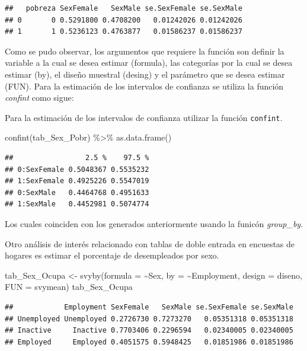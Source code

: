 \documentclass[
  12pt,
]{book}
\newenvironment{Shaded}{\begin{snugshade}}{\end{snugshade}}
\newcommand{\AttributeTok}[1]{\textcolor[rgb]{0.77,0.63,0.00}{#1}}
\newcommand{\FunctionTok}[1]{\textcolor[rgb]{0.00,0.00,0.00}{#1}}
\newcommand{\NormalTok}[1]{#1}
\newcommand{\OtherTok}[1]{\textcolor[rgb]{0.56,0.35,0.01}{#1}}
\newcommand{\SpecialCharTok}[1]{\textcolor[rgb]{0.00,0.00,0.00}{#1}}
\begin{document}
\begin{verbatim}
##   pobreza SexFemale   SexMale se.SexFemale se.SexMale
## 0       0 0.5291800 0.4708200   0.01242026 0.01242026
## 1       1 0.5236123 0.4763877   0.01586237 0.01586237
\end{verbatim}

Como se pudo observar, los argumentos que requiere la función son definir la variable a la cual se desea estimar (formula), las categorías por la cual se desea estimar (by), el diseño muestral (desing) y el parámetro que se desea estimar (FUN). Para la estimación de los intervalos de confianza se utiliza la función \emph{confint} como sigue:

Para la estimación de los intervalos de confianza utilizar la función \texttt{confint}.

\begin{Shaded}
\begin{Highlighting}[]
\FunctionTok{confint}\NormalTok{(tab\_Sex\_Pobr) }\SpecialCharTok{\%\textgreater{}\%} \FunctionTok{as.data.frame}\NormalTok{()}
\end{Highlighting}
\end{Shaded}

\begin{verbatim}
##                 2.5 %    97.5 %
## 0:SexFemale 0.5048367 0.5535232
## 1:SexFemale 0.4925226 0.5547019
## 0:SexMale   0.4464768 0.4951633
## 1:SexMale   0.4452981 0.5074774
\end{verbatim}

Los cuales coinciden con los generados anteriormente usando la funicón \emph{group\_by}.

Otro análisis de interés relacionado con tablas de doble entrada en encuestas de hogares es estimar el porcentaje de desempleados por sexo.

\begin{Shaded}
\begin{Highlighting}[]
\NormalTok{tab\_Sex\_Ocupa }\OtherTok{\textless{}{-}} \FunctionTok{svyby}\NormalTok{(}\AttributeTok{formula =} \SpecialCharTok{\textasciitilde{}}\NormalTok{Sex,  }\AttributeTok{by =} \SpecialCharTok{\textasciitilde{}}\NormalTok{Employment,}
                       \AttributeTok{design =}\NormalTok{ diseno, }\AttributeTok{FUN =}\NormalTok{ svymean)}
\NormalTok{tab\_Sex\_Ocupa}
\end{Highlighting}
\end{Shaded}

\begin{verbatim}
##            Employment SexFemale   SexMale se.SexFemale se.SexMale
## Unemployed Unemployed 0.2726730 0.7273270   0.05351318 0.05351318
## Inactive     Inactive 0.7703406 0.2296594   0.02340005 0.02340005
## Employed     Employed 0.4051575 0.5948425   0.01851986 0.01851986
\end{verbatim}
\end{document}
